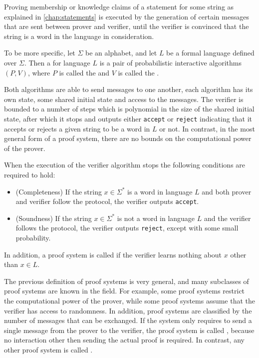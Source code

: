 Proving membership or knowledge claims of a statement for some string as explained in \chaptname{} \ref{chap:statements} is executed by the generation of certain messages that are sent between prover and verifier, until the verifier is convinced that the string is a word in the language in consideration.

To be more specific, let $\Sigma$ be an alphabet, and let $L$ be a formal language defined over $\Sigma$. Then a  for language $L$ is a pair of probabilistic interactive algorithms $(P,V)$, where $P$ is called the  and $V$ is called the . 

Both algorithms are able to send messages to one another, each algorithm has its own state, some shared initial state and access to the messages. The verifier is bounded to a number of steps which is polynomial in the size of the shared initial state, after which it stops and outputs either \texttt{accept} or \texttt{reject} indicating that it accepts or rejects a given string to be a word in $L$ or not. In contrast, in the most general form of a proof system, there are no bounds on the computational power of the prover.

When the execution of the verifier algorithm stops the following conditions are required to hold:
\begin{itemize}
\item (Completeness) If the string $x\in \Sigma^*$ is a word in language $L$ and both prover and verifier follow the protocol, the verifier outputs \texttt{accept}.
\item (Soundness) If the string $x\in \Sigma^*$ is not a word in language $L$ and the verifier follows the protocol, the verifier outputs \texttt{reject}, except with some small probability.
\end{itemize}
In addition, a proof system is called  if the verifier learns nothing about $x$ other than $x\in L$. 

The previous definition of proof systems is very general, and many subclasses of proof systems are known in the field. For example, some proof systems restrict the computational power of the prover, while some proof systems assume that the verifier has access to randomness. In addition, proof systems are classified by the number of messages that can be exchanged. If the system only requires to send a single message from the prover to the verifier, the proof system is called , because no interaction other then sending the actual proof is required. In contrast, any other proof system is called .


